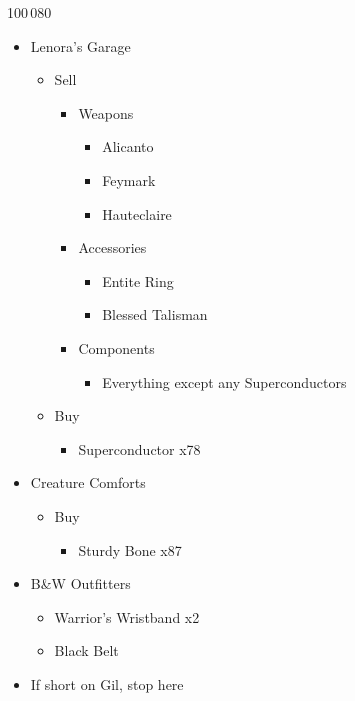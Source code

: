 \documentclass{report}
\begin{document}
\begin{shop}{100\,080}
\begin{itemize}
    \item Lenora's Garage
    \begin{itemize}
        \item Sell
        \begin{itemize}
            \item Weapons
            \begin{itemize}
                \item Alicanto
                \item Feymark
                \item Hauteclaire
            \end{itemize}
            \item Accessories
            \begin{itemize}
                \item Entite Ring
                \item Blessed Talisman
            \end{itemize}
            \item Components
            \begin{itemize}
                \item Everything except any Superconductors
            \end{itemize}
        \end{itemize}
        \item Buy
        \begin{itemize}
            \item Superconductor x78
        \end{itemize}
    \end{itemize}
    \item Creature Comforts
    \begin{itemize}
        \item Buy
        \begin{itemize}
            \item Sturdy Bone x87
        \end{itemize}
    \end{itemize}
    \item B\&W Outfitters
    \begin{itemize}
        \item Warrior's Wristband x2
        \item Black Belt
    \end{itemize}
    \item If short on Gil, stop here

\end{itemize}
\end{shop}
\end{document}
